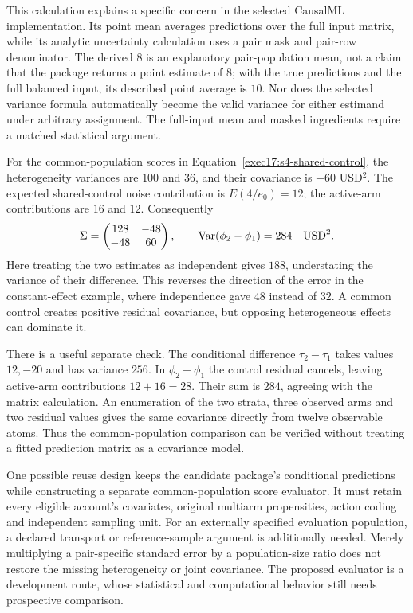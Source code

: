 This calculation explains a specific concern in the selected CausalML
implementation. Its point mean averages predictions over the full input
matrix, while its analytic uncertainty calculation uses a pair mask and
pair-row denominator. The derived $8$ is an explanatory pair-population
mean, not a claim that the package returns a point estimate of $8$; with
the true predictions and the full balanced input, its described point
average is $10$. Nor does the selected variance formula automatically
become the valid variance for either estimand under arbitrary assignment.
The full-input mean and masked ingredients require a matched statistical
argument.~\citep{exec14_causalml_primary}

For the common-population scores in Equation~\eqref{exec17:s4-shared-control},
the heterogeneity variances are $100$ and $36$, and their covariance is
$-60$ USD$^2$. The expected shared-control noise contribution is
$E(4/e_0)=12$; the active-arm contributions are $16$ and $12$.
Consequently
\begin{equation}
 \Sigma=\begin{pmatrix}128&-48\\-48&60\end{pmatrix},\qquad
 \operatorname{Var}(\phi_2-\phi_1)=284\quad {\rm USD}^2.
 \label{exec17:s4-negative-joint}
\end{equation}
Here treating the two estimates as independent gives $188$, understating
the variance of their difference. This reverses the direction of the error
in the constant-effect example, where independence gave $48$ instead of
$32$. A common control creates positive residual covariance, but opposing
heterogeneous effects can dominate it.

There is a useful separate check. The conditional difference
$\tau_2-\tau_1$ takes values $12,-20$ and has variance $256$.
In $\phi_2-\phi_1$ the control residual cancels, leaving active-arm
contributions $12+16=28$. Their sum is $284$, agreeing with the matrix
calculation. An enumeration of the two strata, three observed arms and two
residual values gives the same covariance directly from twelve observable
atoms. Thus the common-population comparison can be verified without
treating a fitted prediction matrix as a covariance model.
\citep{exec17_s4_extension}

One possible reuse design keeps the candidate package's conditional
predictions while constructing a separate common-population score evaluator.
It must retain every eligible account's covariates, original multiarm
propensities, action coding and independent sampling unit. For an externally
specified evaluation population, a declared transport or reference-sample
argument is additionally needed. Merely multiplying a pair-specific standard
error by a population-size ratio does not restore the missing heterogeneity
or joint covariance. The proposed evaluator is a development route, whose
statistical and computational behavior still needs prospective comparison.


